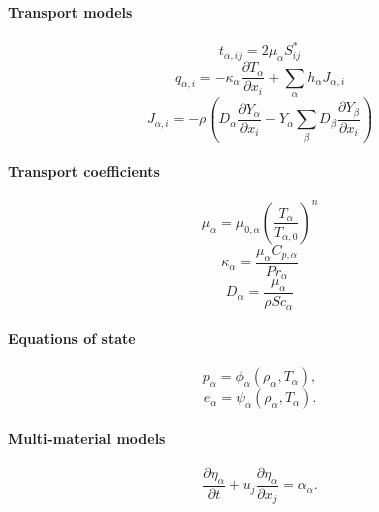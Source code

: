 \documentclass[a4paper,11pt]{article}
\begin{document}
\paragraph{Transport models}

\begin{equation*}
t_{\alpha,ij} = 2\mu_\alpha S_{ij}^*
\end{equation*}
\begin{equation*}
q_{\alpha,i} = -\kappa_\alpha \frac{\partial T_\alpha}{\partial x_i}  + \sum_\alpha h_\alpha J_{\alpha,i}
\end{equation*}
\begin{equation*}
J_{\alpha,i} = -\rho \left ( D_\alpha \frac{\partial Y_\alpha}{\partial x_i} - Y_\alpha \sum_\beta D_\beta \frac{\partial Y_\beta}{\partial x_i} \right )
\end{equation*}

\paragraph{Transport coefficients}

\begin{equation*}
\mu_\alpha = \mu_{0,\alpha} \left ( \frac{T_\alpha}{T_{\alpha,0}} \right )^n
\end{equation*}
\begin{equation*}
\kappa_\alpha = \frac{\mu_\alpha C_{p,\alpha}}{Pr_\alpha}
\end{equation*}
\begin{equation*}
D_\alpha = \frac{\mu_\alpha}{\rho Sc_\alpha}
\end{equation*}

\paragraph{Equations of state}

\begin{equation*}
    p_\alpha = \phi_\alpha (\rho_\alpha, T_\alpha),
\end{equation*}
\begin{equation*}
    e_\alpha = \psi_\alpha (\rho_\alpha, T_\alpha).
\end{equation*}

\paragraph{Multi-material models}
\begin{equation}
    \frac{\partial \eta_\alpha}{\partial t} + u_j \frac{\partial \eta_\alpha}{\partial x_j} = \alpha_\alpha.
\end{equation}
\end{document}
